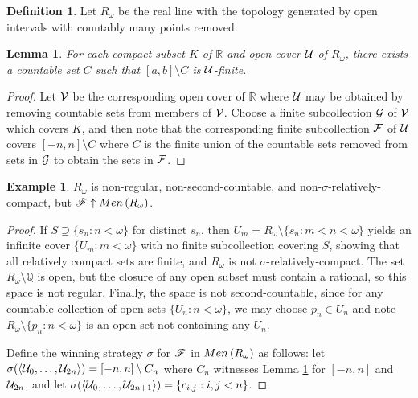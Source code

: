 \documentclass{amsart}
\newtheorem{lemma}[theorem]{Lemma}
\theoremstyle{definition}
\newtheorem{definition}[theorem]{Definition}
\newtheorem{example}[theorem]{Example}
\begin{document}
\begin{definition}
  Let \(R_\omega\) be the real line with the topology generated by open
  intervals with countably many points removed.
\end{definition}

\begin{lemma}\label{rOmegaLemma}
  For each compact subset \(K\) of \(\mathbb R\)
  and open cover \(\mathcal{U}\) of \(R_\omega\),
  there exists a countable set \(C\) such that \([a,b]\setminus C\)
  is \(\mathcal{U}\)-finite.
\end{lemma}

\begin{proof}
  Let \(\mathcal{V}\) be the corresponding open cover of \(\mathbb R\) where
  \(\mathcal{U}\) may be obtained by removing countable sets from members of
  \(\mathcal{V}\). Choose a finite subcollection \(\mathcal{G}\) of \(\mathcal{V}\) which
  covers \(K\), and then note that the corresponding finite subcollection
  \(\mathcal{F}\) of \(\mathcal{U}\) covers \([-n,n]\setminus C\) where \(C\) is the
  finite union of the countable sets removed from sets in \(\mathcal{G}\)
  to obtain the sets in \(\mathcal{F}\).
\end{proof}

\begin{example}
  \(R_\omega\) is non-regular, non-second-countable, and
  non-\(\sigma\)-relatively-compact, but \(\mathscr{F}\uparrow Men\left({R_\omega}\right)\).
\end{example}

\begin{proof}
  If \(S\supseteq\{s_n:n<\omega\}\) for distinct \(s_n\),
  then \(U_m=R_\omega\setminus\{s_n:m<n<\omega\}\) yields an
  infinite cover \(\{U_m:m<\omega\}\) with no finite subcollection covering
  \(S\), showing that all relatively compact sets are finite, and \(R_\omega\)
  is not \(\sigma\)-relatively-compact. The set \(R_\omega\setminus\mathbb Q\)
  is open, but the closure of any open subset must contain a rational, so
  this space is not regular. Finally, the space is not second-countable,
  since for any countable collection of open sets \(\{U_n:n<\omega\}\),
  we may choose \(p_n\in U_n\)
  and note \(R_\omega\setminus\{p_n:n<\omega\}\) is an open set not containing
  any \(U_n\).

  Define the winning strategy \(\sigma\) for \(\mathscr{F}\) in
  \(Men\left({R_\omega}\right)\) as follows: let
  \(\sigma(\langle\mathcal{U}_0,\dots,\mathcal{U}_{2n}\rangle)=[-n,n]\setminus C_n\)
  where \(C_n\) witnesses Lemma \ref{rOmegaLemma} for \([-n,n]\)
  and \(\mathcal{U}_{2n}\),
  and let \(\sigma(\langle\mathcal{U}_0,\dots,\mathcal{U}_{2n+1}\rangle)=\{c_{i,j} : i,j < n\}\).
\end{proof}
\end{document}
